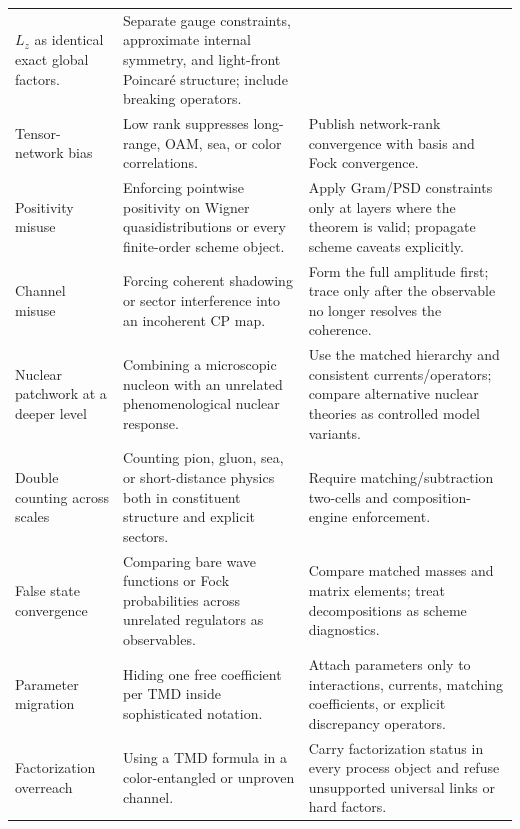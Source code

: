 \documentclass[11pt]{article}
\begin{document}
\begin{longtable}{L{0.22\textwidth}L{0.34\textwidth}L{0.36\textwidth}}
\(L_z\) as identical exact global factors. & Separate gauge constraints,
approximate internal symmetry, and light-front Poincar\'e structure; include
breaking operators.\\
Tensor-network bias & Low rank suppresses long-range, OAM, sea, or color
correlations. & Publish network-rank convergence with basis and Fock
convergence.\\
Positivity misuse & Enforcing pointwise positivity on Wigner
quasidistributions or every finite-order scheme object. & Apply Gram/PSD
constraints only at layers where the theorem is valid; propagate scheme
caveats explicitly.\\
Channel misuse & Forcing coherent shadowing or sector interference into an
incoherent CP map. & Form the full amplitude first; trace only after the
observable no longer resolves the coherence.\\
Nuclear patchwork at a deeper level & Combining a microscopic nucleon with an
unrelated phenomenological nuclear response. & Use the matched hierarchy and
consistent currents/operators; compare alternative nuclear theories as
controlled model variants.\\
Double counting across scales & Counting pion, gluon, sea, or short-distance
physics both in constituent structure and explicit sectors. & Require
matching/subtraction two-cells and composition-engine enforcement.\\
False state convergence & Comparing bare wave functions or Fock
probabilities across unrelated regulators as observables. & Compare matched
masses and matrix elements; treat decompositions as scheme diagnostics.\\
Parameter migration & Hiding one free coefficient per TMD inside sophisticated
notation. & Attach parameters only to interactions, currents, matching
coefficients, or explicit discrepancy operators.\\
Factorization overreach & Using a TMD formula in a color-entangled or
unproven channel. & Carry factorization status in every process object and
refuse unsupported universal links or hard factors.\\
\bottomrule
\end{longtable}
\end{document}
